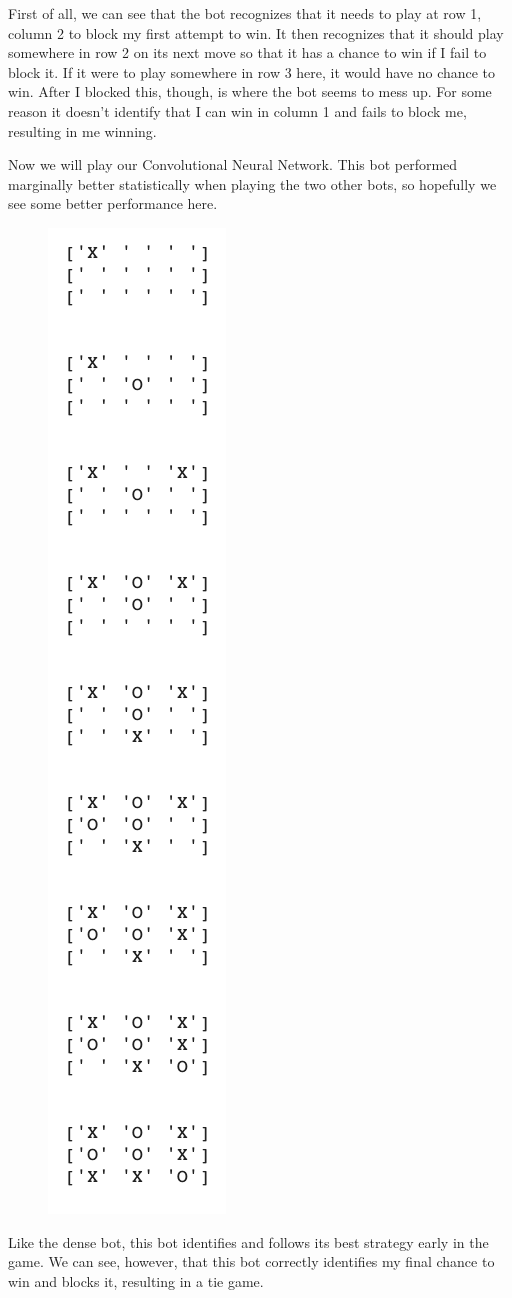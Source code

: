 First of all, we can see that the bot recognizes that it needs to play at row 1, column 2 to block my first attempt to win. It then recognizes that it should play somewhere in row 2 on its next move so that it has a chance to win if I fail to block it. If it were to play somewhere in row 3 here, it would have no chance to win. After I blocked this, though, is where the bot seems to mess up. For some reason it doesn't identify that I can win in column 1 and fails to block me, resulting in me winning.

Now we will play our Convolutional Neural Network. This bot performed marginally better statistically when playing the two other bots, so hopefully we see some better performance here. 

\begin{figure}[H]
	\centering
	\includegraphics[scale=.5]{h_v_conv}
\end{figure}

Like the dense bot, this bot identifies and follows its best strategy early in the game. We can see, however, that this bot correctly identifies my final chance to win and blocks it, resulting in a tie game. 

